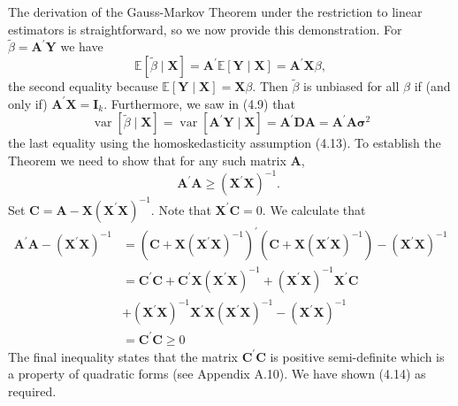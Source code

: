 \documentclass[10pt]{article}
\begin{document}
The derivation of the Gauss-Markov Theorem under the restriction to linear estimators is straightforward, so we now provide this demonstration. For $\widetilde{\beta}=\boldsymbol{A}^{\prime} \boldsymbol{Y}$ we have
$$
\mathbb{E}[\widetilde{\beta} \mid \boldsymbol{X}]=\boldsymbol{A}^{\prime} \mathbb{E}[\boldsymbol{Y} \mid \boldsymbol{X}]=\boldsymbol{A}^{\prime} \boldsymbol{X} \beta,
$$
the second equality because $\mathbb{E}[\boldsymbol{Y} \mid \boldsymbol{X}]=\boldsymbol{X} \beta$. Then $\widetilde{\beta}$ is unbiased for all $\beta$ if (and only if) $\boldsymbol{A}^{\prime} \boldsymbol{X}=\boldsymbol{I}_{k}$. Furthermore, we saw in (4.9) that
$$
\operatorname{var}[\widetilde{\beta} \mid \boldsymbol{X}]=\operatorname{var}\left[\boldsymbol{A}^{\prime} \boldsymbol{Y} \mid \boldsymbol{X}\right]=\boldsymbol{A}^{\prime} \boldsymbol{D} \boldsymbol{A}=\boldsymbol{A}^{\prime} \boldsymbol{A} \boldsymbol{\sigma}^{2}
$$
the last equality using the homoskedasticity assumption (4.13). To establish the Theorem we need to show that for any such matrix $\boldsymbol{A}$,
$$
\boldsymbol{A}^{\prime} \boldsymbol{A} \geq\left(\boldsymbol{X}^{\prime} \boldsymbol{X}\right)^{-1} \text {. }
$$
Set $\boldsymbol{C}=\boldsymbol{A}-\boldsymbol{X}\left(\boldsymbol{X}^{\prime} \boldsymbol{X}\right)^{-1}$. Note that $\boldsymbol{X}^{\prime} \boldsymbol{C}=0$. We calculate that
$$
\begin{aligned}
\boldsymbol{A}^{\prime} \boldsymbol{A}-\left(\boldsymbol{X}^{\prime} \boldsymbol{X}\right)^{-1} &=\left(\boldsymbol{C}+\boldsymbol{X}\left(\boldsymbol{X}^{\prime} \boldsymbol{X}\right)^{-1}\right)^{\prime}\left(\boldsymbol{C}+\boldsymbol{X}\left(\boldsymbol{X}^{\prime} \boldsymbol{X}\right)^{-1}\right)-\left(\boldsymbol{X}^{\prime} \boldsymbol{X}\right)^{-1} \\
&=\boldsymbol{C}^{\prime} \boldsymbol{C}+\boldsymbol{C}^{\prime} \boldsymbol{X}\left(\boldsymbol{X}^{\prime} \boldsymbol{X}\right)^{-1}+\left(\boldsymbol{X}^{\prime} \boldsymbol{X}\right)^{-1} \boldsymbol{X}^{\prime} \boldsymbol{C} \\
&+\left(\boldsymbol{X}^{\prime} \boldsymbol{X}\right)^{-1} \boldsymbol{X}^{\prime} \boldsymbol{X}\left(\boldsymbol{X}^{\prime} \boldsymbol{X}\right)^{-1}-\left(\boldsymbol{X}^{\prime} \boldsymbol{X}\right)^{-1} \\
&=\boldsymbol{C}^{\prime} \boldsymbol{C} \geq 0
\end{aligned}
$$
The final inequality states that the matrix $\boldsymbol{C}^{\prime} \boldsymbol{C}$ is positive semi-definite which is a property of quadratic forms (see Appendix A.10). We have shown (4.14) as required.
\end{document}
